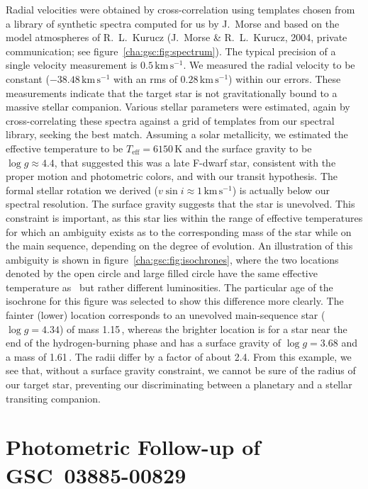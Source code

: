 Radial velocities were obtained by cross-correlation using templates
chosen from a library of synthetic spectra computed for us by J.~Morse
and based on the model atmospheres of R.~L.~Kurucz (J.~Morse \&
R.~L.~Kurucz, 2004, private communication; see figure~\ref{cha:gsc:fig:spectrum}). The typical precision of a
single velocity measurement is $0.5\,\mathrm{km\,s^{-1}}$. We measured
the radial velocity to be constant ($-38.48\,\mathrm{km\,s^{-1}}$ with
an rms of $0.28\,\mathrm{km\,s^{-1}}$) within our errors. These
measurements indicate that the target star is not gravitationally
bound to a massive stellar companion. Various stellar parameters were
estimated, again by cross-correlating these spectra against a grid of
templates from our spectral library, seeking the best match.  Assuming
a solar metallicity, we estimated the effective temperature to be
$T_{\mathrm{eff}}=6150$\,K and the surface gravity to be $\log{g}
\approx 4.4$, that suggested this was a late F-dwarf star, consistent
with the proper motion and photometric colors, and with our transit
hypothesis. The formal stellar rotation we derived ($v\sin{i} \approx
1\,\mathrm{km\,s^{-1}}$) is actually below our spectral
resolution. The surface gravity suggests that the star is unevolved. This
constraint is important, as this star lies within the range of
effective temperatures for which an ambiguity exists as to the
corresponding mass of the star while on the main sequence, depending
on the degree of evolution. An illustration of this ambiguity is shown
in figure~\ref{cha:gsc:fig:isochrones}, where the two locations denoted by the
open circle and large filled circle have the same effective
temperature as \gscOTE\ but rather different luminosities. The particular
age of the isochrone for this figure was selected to show this
difference more clearly. The fainter (lower) location corresponds to
an unevolved main-sequence star ($\log{g}=4.34$) of mass
1.15\,\msun, whereas the brighter location is for a star near the
end of the hydrogen-burning phase and has a surface gravity of
$\log{g}=3.68$ and a mass of 1.61\,\msun. The radii differ by a
factor of about 2.4. From this example, we see that, without a surface
gravity constraint, we cannot be sure of the radius of our target
star, preventing our discriminating between a planetary and a stellar
transiting companion.

\section{Photometric Follow-up of \mbox{GSC 03885-00829}}
\label{cha:gsc:sec:photo}

